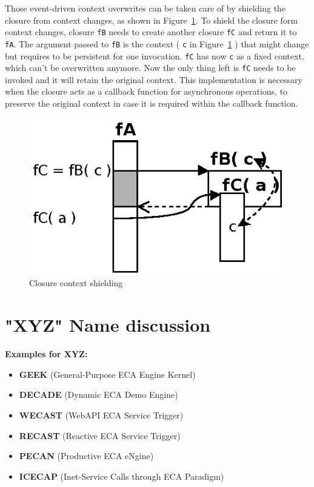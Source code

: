 Those event-driven context overwrites can be taken care of by shielding the closure from context changes, as shown in Figure~\ref{fig:Closures_Closure-3}.
To shield the closure form context changes, closure \texttt{fB} needs to create another closure \texttt{fC} and return it to \texttt{fA}.
The argument passed to \texttt{fB} is the context ( \texttt{c} in Figure~\ref{fig:Closures_Closure-3} ) that might change but requires to be persistent for one invocation.
\texttt{fC} has now \texttt{c} as a fixed context, which can't be overwritten anymore.
Now the only thing left is \texttt{fC} needs to be invoked and it will retain the original context.
This implementation is necessary when the closure acts as a callback function for asynchronous operations, to preserve the original context in case it is required within the callback function.
\begin{figure}[h!]
	\centering
  \includegraphics{figures/Closures_Closure-3}
	\caption{Closure context shielding}
	\label{fig:Closures_Closure-3}
\end{figure}

\newpage
\section{"XYZ" Name discussion}



\textbf{Examples for XYZ:}
\begin{itemize}
  \item \textbf{GEEK} (General-Purpose ECA Engine Kernel)
  \item \textbf{DECADE} (Dynamic ECA Demo Engine)
  \item \textbf{WECAST} (WebAPI ECA Service Trigger)
  \item \textbf{RECAST} (Reactive ECA Service Trigger)
  \item \textbf{PECAN} (Productive ECA eNgine)
  \item \textbf{ICECAP} (Inet-Service Calls through ECA Paradigm)
\end{itemize}
